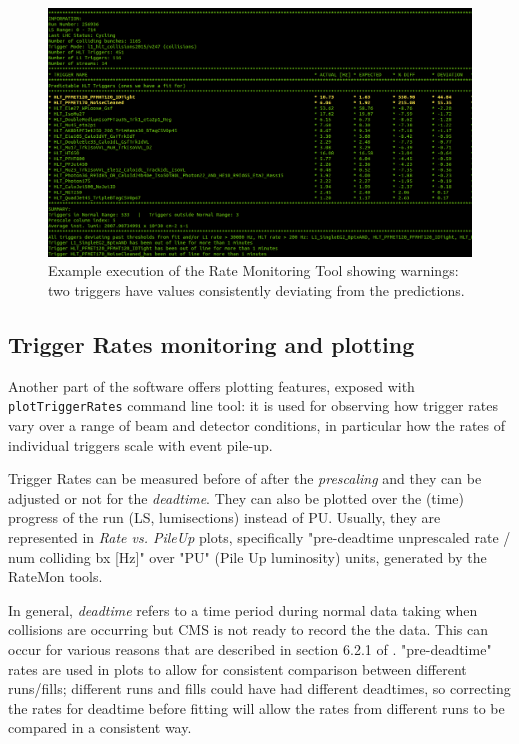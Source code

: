 \begin{figure}
    \centerline{
        \includegraphics[width=0.8\paperwidth]{figures/ratemon_warnings}}
    \caption{Example execution of the Rate Monitoring Tool showing warnings: two triggers have values consistently deviating from the predictions. \cite{ratemon-twiki}}
    \label{fig:ratemon_warnings}
\end{figure}

\subsection{Trigger Rates monitoring and plotting}

Another part of the software offers plotting features, exposed with \texttt{plotTriggerRates} command line tool: it is used for observing how trigger rates vary over a range of beam and detector conditions, in particular how the rates of individual triggers scale with event pile-up.

Trigger Rates can be measured before of after the \textit{prescaling} and they can be adjusted or not for the \textit{deadtime}. They can also be plotted over the (time) progress of the run (LS, lumisections) instead of PU. Usually, they are represented in \textit{Rate vs. PileUp} plots, specifically "pre-deadtime unprescaled rate / num colliding bx [Hz]" over "PU" (Pile Up luminosity) units, generated by the RateMon tools.

In general, \textit{deadtime} refers to a time period during normal data taking when collisions are occurring but CMS is not ready to record the the data. This can occur for various reasons that are described in section 6.2.1 of \cite{Khachatryan_2017}. "pre-deadtime" rates are used in plots to allow for consistent comparison between different runs/fills; different runs and fills could have had different deadtimes, so correcting the rates for deadtime before fitting will allow the rates from different runs to be compared in a consistent way.

